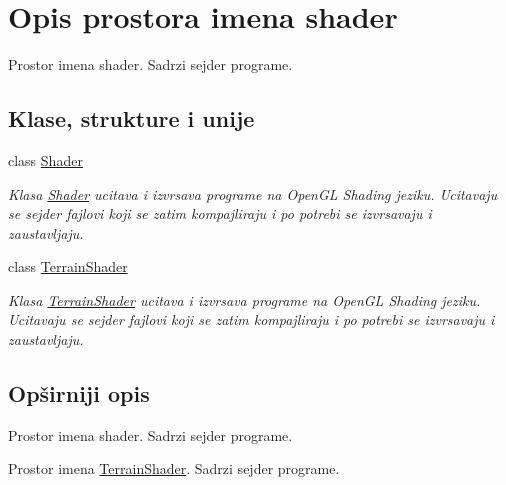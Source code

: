 \hypertarget{namespaceshader}{}\section{Opis prostora imena shader}
\label{namespaceshader}


Prostor imena shader. Sadrzi sejder programe.  


\subsection*{Klase, strukture i unije}
\begin{DoxyCompactItemize}
\item 
class \hyperlink{classshader_1_1Shader}{Shader}
\begin{DoxyCompactList}\small\item\em Klasa \hyperlink{classshader_1_1Shader}{Shader} ucitava i izvrsava programe na Open\+GL Shading jeziku. Ucitavaju se sejder fajlovi koji se zatim kompajliraju i po potrebi se izvrsavaju i zaustavljaju. \end{DoxyCompactList}\item 
class \hyperlink{classshader_1_1TerrainShader}{Terrain\+Shader}
\begin{DoxyCompactList}\small\item\em Klasa \hyperlink{classshader_1_1TerrainShader}{Terrain\+Shader} ucitava i izvrsava programe na Open\+GL Shading jeziku. Ucitavaju se sejder fajlovi koji se zatim kompajliraju i po potrebi se izvrsavaju i zaustavljaju. \end{DoxyCompactList}\end{DoxyCompactItemize}


\subsection{Opširniji opis}
Prostor imena shader. Sadrzi sejder programe. 

Prostor imena \hyperlink{classshader_1_1TerrainShader}{Terrain\+Shader}. Sadrzi sejder programe. 